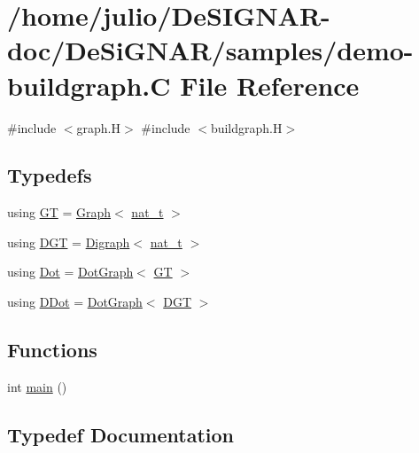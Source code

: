 \hypertarget{demo-buildgraph_8_c}{}\section{/home/julio/\+De\+S\+I\+G\+N\+A\+R-\/doc/\+De\+Si\+G\+N\+A\+R/samples/demo-\/buildgraph.C File Reference}
\label{demo-buildgraph_8_c}
{\ttfamily \#include $<$graph.\+H$>$}\newline
{\ttfamily \#include $<$buildgraph.\+H$>$}\newline
\subsection*{Typedefs}
\begin{DoxyCompactItemize}
\item 
using \hyperlink{demo-buildgraph_8_c_a3001c40d2c31ca87ed96cd7d1334a55e}{GT} = \hyperlink{class_designar_1_1_graph}{Graph}$<$ \hyperlink{namespace_designar_aa72662848b9f4815e7bf31a7cf3e33d1}{nat\+\_\+t} $>$
\item 
using \hyperlink{demo-buildgraph_8_c_ae73e956c2a8cf0a58255aa6b659985e0}{D\+GT} = \hyperlink{class_designar_1_1_digraph}{Digraph}$<$ \hyperlink{namespace_designar_aa72662848b9f4815e7bf31a7cf3e33d1}{nat\+\_\+t} $>$
\item 
using \hyperlink{demo-buildgraph_8_c_a70657b0b48a4d69ef850be3c5517ecc2}{Dot} = \hyperlink{class_designar_1_1_dot_graph}{Dot\+Graph}$<$ \hyperlink{demo-buildgraph_8_c_a3001c40d2c31ca87ed96cd7d1334a55e}{GT} $>$
\item 
using \hyperlink{demo-buildgraph_8_c_a0ffdd103a7285712ccbd9548ff5544e7}{D\+Dot} = \hyperlink{class_designar_1_1_dot_graph}{Dot\+Graph}$<$ \hyperlink{demo-buildgraph_8_c_ae73e956c2a8cf0a58255aa6b659985e0}{D\+GT} $>$
\end{DoxyCompactItemize}
\subsection*{Functions}
\begin{DoxyCompactItemize}
\item 
int \hyperlink{demo-buildgraph_8_c_ae66f6b31b5ad750f1fe042a706a4e3d4}{main} ()
\end{DoxyCompactItemize}


\subsection{Typedef Documentation}
\mbox{\label{demo-buildgraph_8_c_a0ffdd103a7285712ccbd9548ff5544e7}} 
